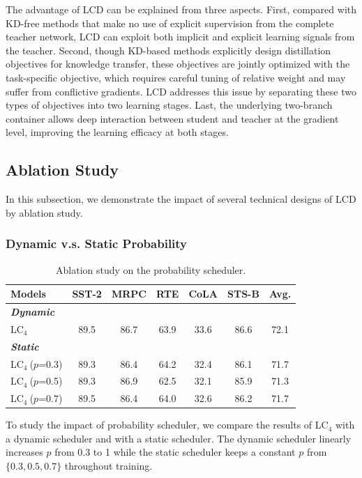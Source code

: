 The advantage of LCD can be explained from three aspects. First, compared with KD-free methods that make no use of explicit supervision from the complete teacher network, LCD can exploit both implicit and explicit learning signals from the teacher. Second, though KD-based methods explicitly design 
distillation objectives for knowledge transfer, these objectives are jointly optimized with the task-specific objective, which requires careful tuning of relative weight and may suffer from conflictive gradients. LCD addresses this issue by separating these two types of 
objectives into two learning stages. Last, the underlying two-branch container allows deep interaction between student and teacher at the gradient level, improving the learning efficacy at both stages.


\subsection{Ablation Study}
\label{sec:ablation}
In this subsection, we demonstrate the impact of several technical designs of LCD by ablation study.

\subsubsection{Dynamic v.s. Static Probability}
\begin{table}[h!]
    \centering
    \scriptsize
    \begin{tabular}{l|ccccc|c}
    \toprule
    Models            & SST-2 & MRPC & RTE  & CoLA & STS-B & Avg.  \\
    \midrule
    \cellcolor[HTML]{EFEFEF}\textbf{\textit{Dynamic}}  & & & & & & \\
    LC$_4$                &89.5   &86.7  &63.9  &33.6  &86.6   &72.1  \\
    \midrule
    \cellcolor[HTML]{EFEFEF}\textbf{\textit{Static}}  & & & & & & \\
    LC$_4~$($p$=0.3)       &89.3   &86.4  &64.2  &32.4  &86.1   &71.7  \\
    LC$_4~$($p$=0.5)       &89.3  &86.9  &62.5  &32.1  &85.9  &71.3 \\
    LC$_4~$($p$=0.7)       &89.5  &86.4  &64.0  &32.6  &86.2  &71.7 \\
    \bottomrule
    \end{tabular}
    \caption{Ablation study on the probability scheduler.}
    \label{table:scheduler}
\end{table}
To study the impact of probability scheduler, we compare the results of LC$_4$ with a dynamic scheduler and with a 
static scheduler. The dynamic scheduler linearly increases $p$ from 0.3 to 1 while the static scheduler keeps a constant $p$ from $\{0.3, 0.5, 0.7\}$ throughout training. 


